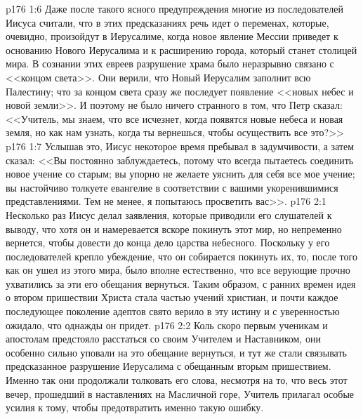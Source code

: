 \vs p176 1:6 Даже после такого ясного предупреждения многие из последователей Иисуса считали, что в этих предсказаниях речь идет о переменах, которые, очевидно, произойдут в Иерусалиме, когда новое явление Мессии приведет к основанию Нового Иерусалима и к расширению города, который станет столицей мира. В сознании этих евреев разрушение храма было неразрывно связано с <<концом света>>. Они верили, что Новый Иерусалим заполнит всю Палестину; что за концом света сразу же последует появление <<новых небес и новой земли>>. И поэтому не было ничего странного в том, что Петр сказал: <<Учитель, мы знаем, что все исчезнет, когда появятся новые небеса и новая земля, но как нам узнать, когда ты вернешься, чтобы осуществить все это?>>
\vs p176 1:7 Услышав это, Иисус некоторое время пребывал в задумчивости, а затем сказал: <<Вы постоянно заблуждаетесь, потому что всегда пытаетесь соединить новое учение со старым; вы упорно не желаете уяснить для себя все мое учение; вы настойчиво толкуете евангелие в соответствии с вашими укоренившимися представлениями. Тем не менее, я попытаюсь просветить вас>>.
\vs p176 2:1 Несколько раз Иисус делал заявления, которые приводили его слушателей к выводу, что хотя он и намеревается вскоре покинуть этот мир, но непременно вернется, чтобы довести до конца дело царства небесного. Поскольку у его последователей крепло убеждение, что он собирается покинуть их, то, после того как он ушел из этого мира, было вполне естественно, что все верующие прочно ухватились за эти его обещания вернуться. Таким образом, с ранних времен идея о втором пришествии Христа стала частью учений христиан, и почти каждое последующее поколение адептов свято верило в эту истину и с уверенностью ожидало, что однажды он придет.
\vs p176 2:2 Коль скоро первым ученикам и апостолам предстояло расстаться со своим Учителем и Наставником, они особенно сильно уповали на это обещание вернуться, и тут же стали связывать предсказанное разрушение Иерусалима с обещанным вторым пришествием. Именно так они продолжали толковать его слова, несмотря на то, что весь этот вечер, прошедший в наставлениях на Масличной горе, Учитель прилагал особые усилия к тому, чтобы предотвратить именно такую ошибку.
